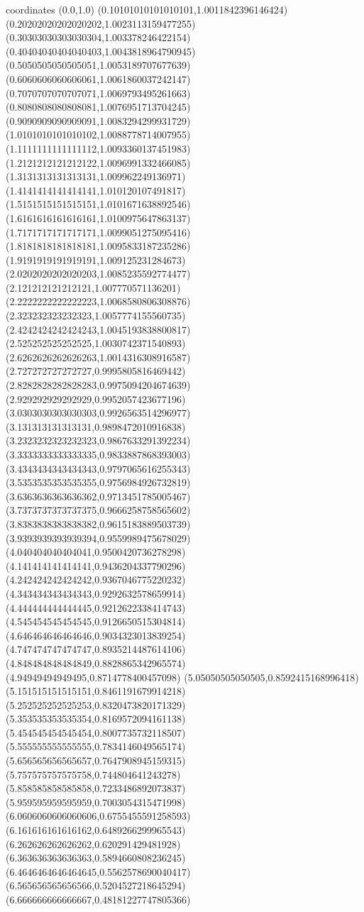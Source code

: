 coordinates {%
(0.0,1.0)
(0.10101010101010101,1.0011842396146424)
(0.20202020202020202,1.0023113159477255)
(0.30303030303030304,1.003378246422154)
(0.40404040404040403,1.0043818964790945)
(0.5050505050505051,1.0053189707677639)
(0.6060606060606061,1.0061860037242147)
(0.7070707070707071,1.0069793495261663)
(0.8080808080808081,1.0076951713704245)
(0.9090909090909091,1.0083294299931729)
(1.0101010101010102,1.0088778714007955)
(1.1111111111111112,1.0093360137451983)
(1.2121212121212122,1.0096991332466085)
(1.3131313131313131,1.009962249136971)
(1.4141414141414141,1.010120107491817)
(1.5151515151515151,1.0101671638892546)
(1.6161616161616161,1.0100975647863137)
(1.7171717171717171,1.0099051275095416)
(1.8181818181818181,1.0095833187235286)
(1.9191919191919191,1.009125231284673)
(2.0202020202020203,1.0085235592774477)
(2.121212121212121,1.007770571136201)
(2.2222222222222223,1.0068580806308876)
(2.323232323232323,1.0057774155560735)
(2.4242424242424243,1.0045193838800817)
(2.525252525252525,1.0030742371540893)
(2.6262626262626263,1.0014316308916587)
(2.727272727272727,0.9995805816469442)
(2.8282828282828283,0.9975094204674639)
(2.929292929292929,0.9952057423677196)
(3.0303030303030303,0.9926563514296977)
(3.131313131313131,0.9898472010916838)
(3.2323232323232323,0.9867633291392234)
(3.3333333333333335,0.9833887868393003)
(3.4343434343434343,0.9797065616255343)
(3.5353535353535355,0.9756984926732819)
(3.6363636363636362,0.9713451785005467)
(3.7373737373737375,0.9666258758565602)
(3.8383838383838382,0.9615183889503739)
(3.9393939393939394,0.9559989475678029)
(4.040404040404041,0.9500420736278298)
(4.141414141414141,0.9436204337790296)
(4.242424242424242,0.9367046775220232)
(4.343434343434343,0.9292632578659914)
(4.444444444444445,0.9212622338414743)
(4.545454545454545,0.9126650515304814)
(4.646464646464646,0.9034323013839254)
(4.747474747474747,0.8935214487614106)
(4.848484848484849,0.8828865342965574)
(4.94949494949495,0.8714778400457098)
(5.05050505050505,0.8592415168996418)
(5.151515151515151,0.8461191679914218)
(5.252525252525253,0.8320473820171329)
(5.353535353535354,0.8169572094161138)
(5.454545454545454,0.8007735732118507)
(5.555555555555555,0.7834146049565174)
(5.656565656565657,0.7647908945159315)
(5.757575757575758,0.744804641243278)
(5.858585858585858,0.7233486892073837)
(5.959595959595959,0.7003054315471998)
(6.0606060606060606,0.6755455591258593)
(6.161616161616162,0.6489266299965543)
(6.262626262626262,0.620291429481928)
(6.363636363636363,0.5894660808236245)
(6.4646464646464645,0.5562578690040417)
(6.565656565656566,0.5204527218645294)
(6.666666666666667,0.48181227747805366)
}
